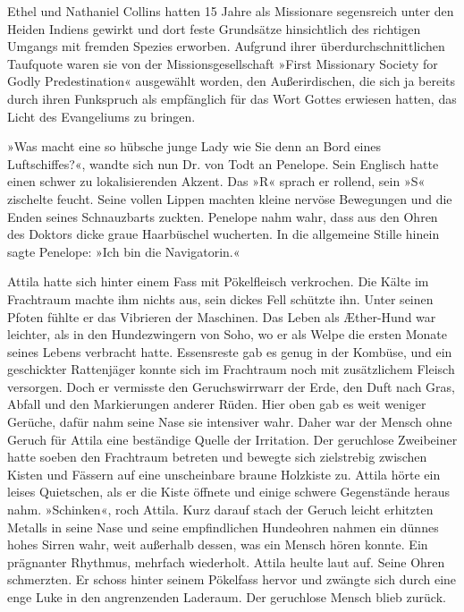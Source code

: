 Ethel und Nathaniel Collins hatten 15 Jahre als Missionare
segensreich unter den Heiden Indiens gewirkt und dort feste
Grundsätze hinsichtlich des richtigen Umgangs mit fremden Spezies
erworben. Aufgrund ihrer überdurchschnittlichen Taufquote waren sie
von der Missionsgesellschaft »First Missionary Society for Godly
Predestination« ausgewählt worden, den Außerirdischen, die sich ja
bereits durch ihren Funkspruch als empfänglich für das Wort Gottes
erwiesen hatten, das Licht des Evangeliums zu bringen.

»Was macht eine so hübsche junge Lady wie Sie denn an Bord eines
Luftschiffes?«, wandte sich nun Dr. von Todt an Penelope. Sein
Englisch hatte einen schwer zu lokalisierenden Akzent. Das »R«
sprach er rollend, sein »S« zischelte feucht. Seine vollen Lippen
machten kleine nervöse Bewegungen und die Enden seines Schnauzbarts
zuckten. Penelope nahm wahr, dass aus den Ohren des Doktors dicke
graue Haarbüschel wucherten. In die allgemeine Stille hinein sagte
Penelope: »Ich bin die Navigatorin.«

\tb

Attila hatte sich hinter einem Fass mit Pökelfleisch verkrochen.
Die Kälte im Frachtraum machte ihm nichts aus, sein dickes Fell
schützte ihn. Unter seinen Pfoten fühlte er das Vibrieren der
Maschinen. Das Leben als Æther-Hund war leichter, als in den
Hundezwingern von Soho, wo er als Welpe die ersten Monate seines
Lebens verbracht hatte. Essensreste gab es genug in der Kombüse,
und ein geschickter Rattenjäger konnte sich im Frachtraum noch mit
zusätzlichem Fleisch versorgen. Doch er vermisste den
Geruchswirrwarr der Erde, den Duft nach Gras, Abfall und den
Markierungen anderer Rüden. Hier oben gab es weit weniger Gerüche,
dafür nahm seine Nase sie intensiver wahr. Daher war der Mensch
ohne Geruch für Attila eine beständige Quelle der Irritation. Der
geruchlose Zweibeiner hatte soeben den Frachtraum betreten und
bewegte sich zielstrebig zwischen Kisten und Fässern auf eine
unscheinbare braune Holzkiste zu. Attila hörte ein leises
Quietschen, als er die Kiste öffnete und einige schwere Gegenstände
heraus nahm. »Schinken«, roch Attila. Kurz darauf stach der Geruch
leicht erhitzten Metalls in seine Nase und seine empfindlichen
Hundeohren nahmen ein dünnes hohes Sirren wahr, weit außerhalb
dessen, was ein Mensch hören konnte. Ein prägnanter Rhythmus,
mehrfach wiederholt. Attila heulte laut auf. Seine Ohren
schmerzten. Er schoss hinter seinem Pökelfass hervor und zwängte
sich durch eine enge Luke in den angrenzenden Laderaum. Der
geruchlose Mensch blieb zurück.

